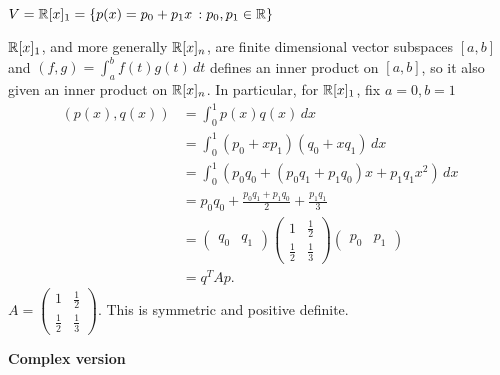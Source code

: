 \documentclass[10pt, a4paper]{article}
\begin{document}
\begin{example}
    $V = \mathbb{R}[x]_1 = \{p(x) = p_0 + p_1x\,: p_0, p_1 \in \mathbb{R}\}$

    $\mathbb{R}[x]_1$,
    and more generally $\mathbb{R}[x]_n$,
    are finite dimensional vector subspaces $[a, b]$ and $(f, g) = \int_{a}^{b}f(t)g(t)\,dt$ defines an inner product on $[a, b]$,
    so it also given an inner product on $\mathbb{R}[x]_n$.
    In particular,
    for $\mathbb{R}[x]_1$,
    fix $a = 0, b = 1$
    \begin{align*}
        (p(x), q(x)) &= \int_{0}^{1}p(x)q(x)\,dx \\
        &= \int_{0}^{1}(p_0 + xp_1)(q_0 + xq_1)\,dx \\
        &= \int_{0}^{1}(p_0q_0 + (p_0q_1 + p_1q_0)x + p_1q_1x ^ 2)\,dx \\
        &= p_0q_0 + \frac{p_0q_1 + p_1q_0}{2} + \frac{p_1q_1}{3} \\
        &= \begin{pmatrix}
            q_0 & q_1
        \end{pmatrix}\begin{pmatrix}
            1 & \frac{1}{2} \\
            \frac{1}{2} & \frac{1}{3}
        \end{pmatrix}\begin{pmatrix}
            p_0 & p_1
        \end{pmatrix} \\
        &= q ^ TAp.
    \end{align*}
    $A = \begin{pmatrix}
        1 & \frac{1}{2} \\
        \frac{1}{2} & \frac{1}{3}
    \end{pmatrix}$.
    This is symmetric and positive definite.
\end{example}

\textbf{Complex version}
\end{document}
